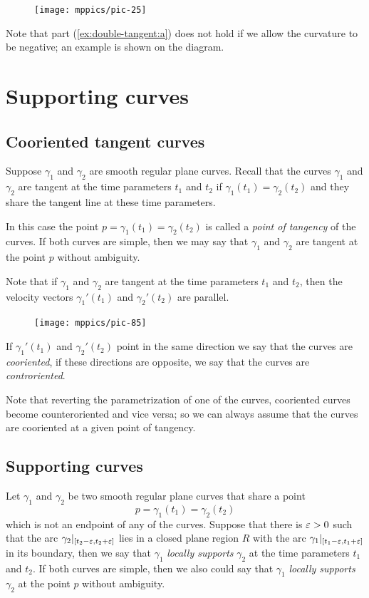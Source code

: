 {

\begin{figure}
\vskip-4mm
\centering
\texttt{[image: mppics/pic-25]}
\vskip0mm
\end{figure}

Note that part (\ref{ex:double-tangent:a}) does not hold if we allow the curvature to be negative; an example is shown on the diagram.

}

\chapter{Supporting curves}

\section*{Cooriented tangent curves}

Suppose $\gamma_1$ and $\gamma_2$ are smooth regular plane curves.
Recall that the curves $\gamma_1$ and $\gamma_2$ are tangent at the  time parameters $t_1$ and $t_2$
if $\gamma_1(t_1)=\gamma_2(t_2)$
and they share the tangent line at these time parameters.

In this case the point $p=\gamma_1(t_1)=\gamma_2(t_2)$ is called a \emph{point of tangency} of the curves.
If both curves are simple, then we may say that $\gamma_1$ and $\gamma_2$ are tangent at the point $p$ 
without ambiguity.

Note that if $\gamma_1$ and $\gamma_2$ are tangent at the time parameters $t_1$ and $t_2$, 
then the velocity vectors $\gamma_1'(t_1)$ and $\gamma_2'(t_2)$ are parallel.
\begin{figure}[h!]
\vskip-0mm
\centering
\texttt{[image: mppics/pic-85]}
\vskip0mm
\end{figure}
If $\gamma_1'(t_1)$ and $\gamma_2'(t_2)$ point in the same direction we say that the curves are \emph{cooriented},
if these directions are opposite, we say that the curves are \emph{controriented}.


Note that reverting the parametrization of one of the curves, cooriented curves become counteroriented and vice versa; so we can always assume that the curves are cooriented at a given point of tangency.

\section*{Supporting curves}

Let $\gamma_1$ and $\gamma_2$ be two smooth regular plane curves that share a point \[p=\gamma_1(t_1)=\gamma_2(t_2)\] which is not an endpoint of any of the curves.
Suppose that there is $\varepsilon>0$ such that the arc $\gamma_2|_{[t_2-\varepsilon, t_2+\varepsilon]}$ lies in a closed plane region $R$ with the arc $\gamma_1|_{[t_1-\varepsilon, t_1+\varepsilon]}$ in its boundary,
then we say that $\gamma_1$ \emph{locally supports} $\gamma_2$ at the time parameters $t_1$ and $t_2$.
If both curves are simple, then we also could say that $\gamma_1$ \emph{locally supports} $\gamma_2$ at the point $p$ without ambiguity.


